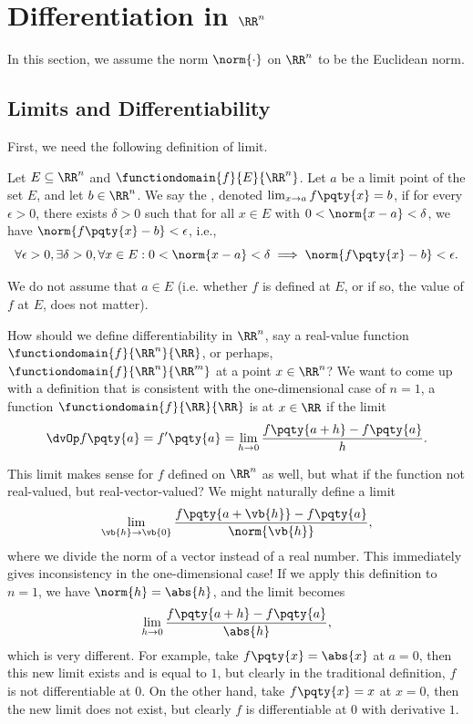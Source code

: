 \section{Differentiation in \(\RR^n\)}

In this section, we assume the norm \(\norm{\cdot}\) on \(\RR^n\) to be the Euclidean norm.

\subsection{Limits and Differentiability}

First, we need the following definition of limit.

\begin{definition}[Limit in \(\RR^n\)]
    Let \(E \subseteq \RR^n\) and \(\functiondomain{f}{E}{\RR^n}\). Let \(a\) be a limit point of the set \(E\), and let \(b \in \RR^n\). We say the , denoted \(\lim_{x \to a} f\pqty{x} = b\), if for every \(\epsilon > 0\), there exists \(\delta > 0\) such that for all \(x \in E\) with \(0 < \norm{x - a} < \delta\), we have \(\norm{f\pqty{x} - b} < \epsilon\), i.e.,
    \[
        \forall \epsilon > 0, \exists \delta > 0, \forall x \in E: 0 < \norm{x - a} < \delta \implies \norm{f\pqty{x} - b} < \epsilon.
    \]
\end{definition}

\begin{remark}
    We do not assume that \(a \in E\) (i.e. whether \(f\) is defined at \(E\), or if so, the value of \(f\) at \(E\), does not matter).
\end{remark}

How should we define differentiability in \(\RR^n\), say a real-value function \(\functiondomain{f}{\RR^n}{\RR}\), or perhaps, \(\functiondomain{f}{\RR^n}{\RR^m}\) at a point \(x \in \RR^n\)? We want to come up with a definition that is consistent with the one-dimensional case of \(n = 1\), a function \(\functiondomain{f}{\RR}{\RR}\) is  at \(x \in \RR\) if the limit
\[
    \dvOp f\pqty{a} = f'\pqty{a} = \lim_{h \to 0} \frac{f\pqty{a + h} - f\pqty{a}}{h}.
\]

This limit makes sense for \(f\) defined on \(\RR^n\) as well, but what if the function not real-valued, but real-vector-valued? We might naturally define a limit
\[
    \lim_{\vb{h} \to \vb{0}} \frac{f\pqty{a + \vb{h}} - f\pqty{a}}{\norm{\vb{h}}},
\]
where we divide the norm of a vector instead of a real number. This immediately gives inconsistency in the one-dimensional case! If we apply this definition to \(n = 1\), we have \(\norm{h} = \abs{h}\), and the limit becomes
\[
    \lim_{h \to 0} \frac{f\pqty{a + h} - f\pqty{a}}{\abs{h}},
\]
which is very different. For example, take \(f\pqty{x} = \abs{x}\) at \(a = 0\), then this new limit exists and is equal to \(1\), but clearly in the traditional definition, \(f\) is not differentiable at \(0\). On the other hand, take \(f\pqty{x} = x\) at \(x = 0\), then the new limit does not exist, but clearly \(f\) is differentiable at \(0\) with derivative \(1\).

